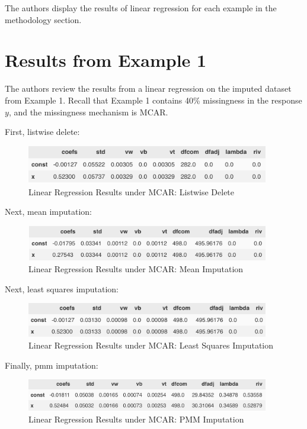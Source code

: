 \documentclass[12pt,oneside]{chicagocapstone}
\begin{document}
The authors display the results of linear regression for each example in
the methodology section.

\section*{Results from Example 1}\label{results-from-example-1}

The authors review the results from a linear regression on the imputed
dataset from Example 1. Recall that Example 1 contains 40\% missingness
in the response \(y\), and the missingness mechanism is MCAR.

First, listwise delete:
\begin{figure}

{\centering \includegraphics[width=400px]{figure/mcar-listwise-delete} 

}

\caption{Linear Regression Results under MCAR: Listwise Delete}\label{fig:mcar-listwise-delete}
\end{figure}
Next, mean imputation:
\begin{figure}

{\centering \includegraphics[width=400px]{figure/mcar-mean} 

}

\caption{Linear Regression Results under MCAR: Mean Imputation}\label{fig:mcar-mean}
\end{figure}
Next, least squares imputation:
\begin{figure}

{\centering \includegraphics[width=400px]{figure/mcar-ls} 

}

\caption{Linear Regression Results under MCAR: Least Squares Imputation}\label{fig:mcar-ls}
\end{figure}
Finally, pmm imputation:
\begin{figure}

{\centering \includegraphics[width=400px]{figure/mcar-pmm} 

}

\caption{Linear Regression Results under MCAR: PMM Imputation}\label{fig:mcar-pmm}
\end{figure}
\end{document}
